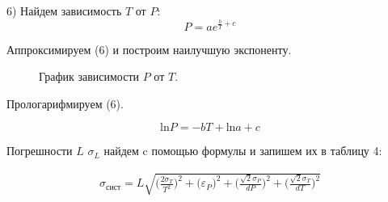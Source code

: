 \documentclass[11pt]{article}
\begin{document}
\par 6) Найдем зависимость $T$ от $P$:
\begin{equation}
    P = a e^{\frac{b}{T} + c}
\end{equation}
\par Аппроксимируем (6) и построим наилучшую экспоненту. 

\begin{figure}[H]
\caption{График зависимости $P$ от $T$.}
\label{fig:image}
\end{figure}

\par Прологарифмируем (6).

\begin{equation}
    \text{ln} P = -b T + \text{ln} a + c
\end{equation}

\par Погрешности $L$  $\sigma_{L}$ найдем c помощью формулы и запишем их в таблицу 4:

\begin{equation}
\begin{gathered}
    \sigma_{сист} = L\sqrt{\biggl(\frac{2\sigma_{T}}{T^{2}}\biggr)^{2} + \bigl(\varepsilon_{P}\bigr)^{2} + \biggl(\frac{\sqrt{2}\sigma_{P}}{dP}\biggr)^{2} + \biggl(\frac{\sqrt{2}\sigma_{T}}{dT}\biggr)^{2}} \\
\end{gathered}
\end{equation}
\end{document}

